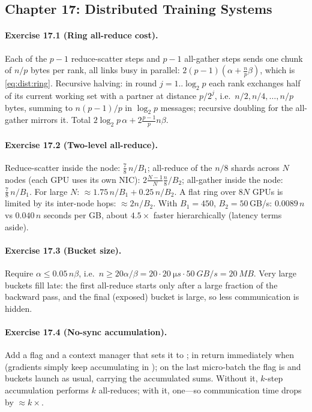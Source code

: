 \subsection*{Chapter 17: Distributed Training Systems}

\paragraph{Exercise 17.1 (Ring all-reduce cost).}
Each of the $p-1$ reduce-scatter steps and $p-1$ all-gather steps sends one chunk of $n/p$
bytes per rank, all links busy in parallel: $2(p-1)(\alpha+\frac np\beta)$, which is
\cref{eq:dist:ring}. Recursive halving: in round $j=1..\log_2p$ each rank exchanges half of its
current working set with a partner at distance $p/2^j$, i.e.\ $n/2,n/4,\dots,n/p$ bytes, summing
to $n(p-1)/p$ in $\log_2p$ messages; recursive doubling for the all-gather mirrors it. Total
$2\log_2p\,\alpha+2\frac{p-1}{p}n\beta$.

\paragraph{Exercise 17.2 (Two-level all-reduce).}
Reduce-scatter inside the node: $\frac78\,n/B_1$; all-reduce of the $n/8$ shards across $N$
nodes (each GPU uses its own NIC): $2\frac{N-1}{N}\frac n8/B_2$; all-gather inside the node:
$\frac78\,n/B_1$. For large $N$: $\approx1.75\,n/B_1+0.25\,n/B_2$. A flat ring over $8N$ GPUs is
limited by its inter-node hops: $\approx2n/B_2$. With $B_1=450$, $B_2=50$\,GB/s: $0.0089\,n$ vs
$0.040\,n$ seconds per GB, about $4.5\times$ faster hierarchically (latency terms aside).

\paragraph{Exercise 17.3 (Bucket size).}
Require $\alpha\le0.05\,n\beta$, i.e.\ $n\ge20\alpha/\beta=20\cdot\SI{20}{\micro s}\cdot\SI{50}{GB/s}
=\SI{20}{MB}$. Very large buckets fill late: the first all-reduce starts only after a large
fraction of the backward pass, and the final (exposed) bucket is large, so less communication is
hidden.

\paragraph{Exercise 17.4 (No-sync accumulation).}
Add a flag  and a context manager that sets it to ; in
 return immediately when  (gradients simply keep
accumulating in ); on the last micro-batch the flag is  and buckets
launch as usual, carrying the accumulated sums. Without it, $k$-step accumulation performs $k$
all-reduces; with it, one---so communication time drops by $\approx k\times$.


